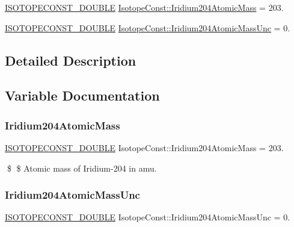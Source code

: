 \begin{DoxyCompactItemize}
\item 
\mbox{\hyperlink{group___isotope_const-_macros_ga8f45a7272ce02c0b4c65c44636ed719a}{I\+S\+O\+T\+O\+P\+E\+C\+O\+N\+S\+T\+\_\+\+D\+O\+U\+B\+LE}} \mbox{\hyperlink{group___isotope_const-_iridium-_ir204_ga61f419f4809411c2553c5e783e166a10}{Isotope\+Const\+::\+Iridium204\+Atomic\+Mass}} = 203.
\item 
\mbox{\hyperlink{group___isotope_const-_macros_ga8f45a7272ce02c0b4c65c44636ed719a}{I\+S\+O\+T\+O\+P\+E\+C\+O\+N\+S\+T\+\_\+\+D\+O\+U\+B\+LE}} \mbox{\hyperlink{group___isotope_const-_iridium-_ir204_ga4b6855a24fda5f973094135d1bbe693a}{Isotope\+Const\+::\+Iridium204\+Atomic\+Mass\+Unc}} = 0.
\end{DoxyCompactItemize}


\subsection{Detailed Description}


\subsection{Variable Documentation}
\mbox{\label{group___isotope_const-_iridium-_ir204_ga61f419f4809411c2553c5e783e166a10}} 
\subsubsection{\texorpdfstring{Iridium204\+Atomic\+Mass}{Iridium204AtomicMass}}
{\footnotesize\ttfamily \mbox{\hyperlink{group___isotope_const-_macros_ga8f45a7272ce02c0b4c65c44636ed719a}{I\+S\+O\+T\+O\+P\+E\+C\+O\+N\+S\+T\+\_\+\+D\+O\+U\+B\+LE}} Isotope\+Const\+::\+Iridium204\+Atomic\+Mass = 203.}

\$ \$ Atomic mass of Iridium-\/204 in amu. \mbox{\label{group___isotope_const-_iridium-_ir204_ga4b6855a24fda5f973094135d1bbe693a}} 
\subsubsection{\texorpdfstring{Iridium204\+Atomic\+Mass\+Unc}{Iridium204AtomicMassUnc}}
{\footnotesize\ttfamily \mbox{\hyperlink{group___isotope_const-_macros_ga8f45a7272ce02c0b4c65c44636ed719a}{I\+S\+O\+T\+O\+P\+E\+C\+O\+N\+S\+T\+\_\+\+D\+O\+U\+B\+LE}} Isotope\+Const\+::\+Iridium204\+Atomic\+Mass\+Unc = 0.}

